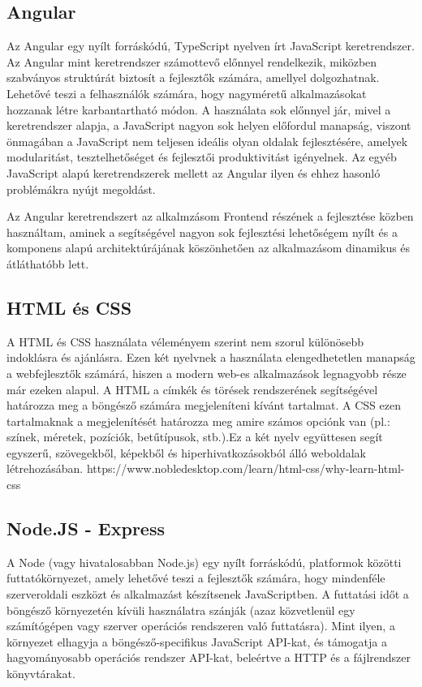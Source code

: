 \subsection{Angular}
Az Angular egy nyílt forráskódú, TypeScript nyelven írt JavaScript keretrendszer. Az Angular mint keretrendszer számottevő előnnyel rendelkezik, miközben szabványos struktúrát biztosít a fejlesztők számára, amellyel dolgozhatnak. Lehetővé teszi a felhasználók számára, hogy nagyméretű alkalmazásokat hozzanak létre karbantartható módon. A használata sok előnnyel jár, mivel a keretrendszer alapja, a JavaScript nagyon sok helyen előfordul manapság, viszont önmagában a JavaScript nem teljesen ideális olyan oldalak fejlesztésére, amelyek modularitást, tesztelhetőséget és fejlesztői produktivitást igényelnek. Az egyéb JavaScript alapú keretrendszerek mellett az Angular ilyen és ehhez hasonló problémákra nyújt megoldást.

Az Angular keretrendszert az alkalmzásom Frontend részének a fejlesztése közben használtam, aminek a segítségével nagyon sok fejlesztési lehetőségem nyílt és a komponens alapú architektúrájának köszönhetően az alkalmazásom dinamikus és átláthatóbb lett.
\cite{Angular}
\subsection{HTML és CSS}
A HTML és CSS használata véleményem szerint nem szorul különösebb indoklásra és ajánlásra. Ezen két nyelvnek a használata elengedhetetlen manapság a webfejlesztők számárá, hiszen a modern web-es alkalmazások legnagyobb része már ezeken alapul. A HTML a címkék és törések rendszerének segítségével határozza meg a böngésző számára megjeleníteni kívánt tartalmat. A CSS ezen tartalmaknak a megjelenítését határozza meg amire számos opciónk van (pl.: színek, méretek, pozíciók, betűtípusok, stb.).Ez a két nyelv együttesen segít egyszerű, szövegekből, képekből és hiperhivatkozásokból álló weboldalak létrehozásában.
https://www.nobledesktop.com/learn/html-css/why-learn-html-css
\subsection{Node.JS - Express}
 A Node (vagy hivatalosabban Node.js) egy nyílt forráskódú, platformok közötti futtatókörnyezet, amely lehetővé teszi a fejlesztők számára, hogy mindenféle szerveroldali eszközt és alkalmazást készítsenek JavaScriptben. A futtatási időt a böngésző környezetén kívüli használatra szánják (azaz közvetlenül egy számítógépen vagy szerver operációs rendszeren való futtatásra). Mint ilyen, a környezet elhagyja a böngésző-specifikus JavaScript API-kat, és támogatja a hagyományosabb operációs rendszer API-kat, beleértve a HTTP és a fájlrendszer könyvtárakat.
 
